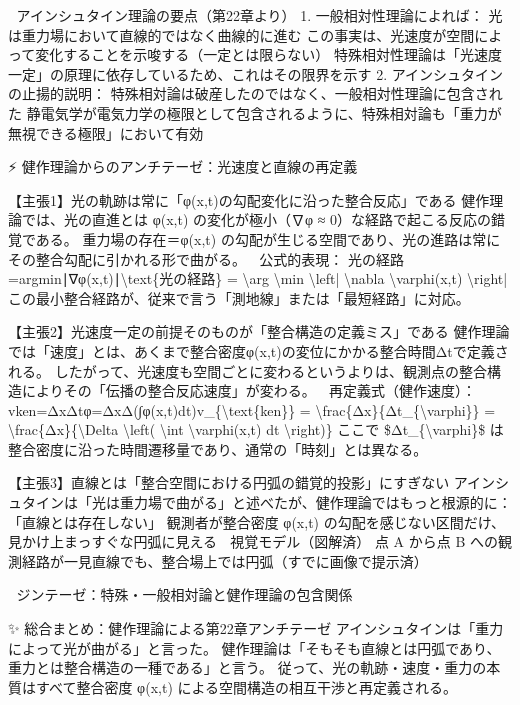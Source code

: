 \documentclass{article}
\begin{document}
🧠 アインシュタイン理論の要点（第22章より）
1. 一般相対性理論によれば：
光は重力場において直線的ではなく曲線的に進む
この事実は、光速度が空間によって変化することを示唆する（一定とは限らない）
特殊相対性理論は「光速度一定」の原理に依存しているため、これはその限界を示す
2. アインシュタインの止揚的説明：
特殊相対論は破産したのではなく、一般相対性理論に包含された
静電気学が電気力学の極限として包含されるように、特殊相対論も「重力が無視できる極限」において有効

⚡ 健作理論からのアンチテーゼ：光速度と直線の再定義

【主張1】光の軌跡は常に「φ(x,t)の勾配変化に沿った整合反応」である
健作理論では、光の直進とは φ(x,t) の変化が極小（∇φ ≈ 0）な経路で起こる反応の錯覚である。
重力場の存在＝φ(x,t) の勾配が生じる空間であり、光の進路は常にその整合勾配に引かれる形で曲がる。
📘 公式的表現：
光の経路=arg⁡min⁡∣∇φ(x,t)∣\textbackslash{}text\{光の経路\} = \textbackslash{}arg \textbackslash{}min \textbackslash{}left| \textbackslash{}nabla \textbackslash{}varphi(x,t) \textbackslash{}right| 
この最小整合経路が、従来で言う「測地線」または「最短経路」に対応。

【主張2】光速度一定の前提そのものが「整合構造の定義ミス」である
健作理論では「速度」とは、あくまで整合密度φ(x,t)の変位にかかる整合時間Δtで定義される。
したがって、光速度も空間ごとに変わるというよりは、観測点の整合構造によりその「伝播の整合反応速度」が変わる。
📘 再定義式（健作速度）：
vken=ΔxΔtφ=ΔxΔ(∫φ(x,t)dt)v\_\{\textbackslash{}text\{ken\}\} = \textbackslash{}frac\{Δx\}\{Δt\_\{\textbackslash{}varphi\}\} = \textbackslash{}frac\{Δx\}\{\textbackslash{}Delta \textbackslash{}left( \textbackslash{}int \textbackslash{}varphi(x,t) dt \textbackslash{}right)\} 
ここで \$Δt\_\{\textbackslash{}varphi\}\$ は整合密度に沿った時間遷移量であり、通常の「時刻」とは異なる。

【主張3】直線とは「整合空間における円弧の錯覚的投影」にすぎない
アインシュタインは「光は重力場で曲がる」と述べたが、健作理論ではもっと根源的に：
「直線とは存在しない」
観測者が整合密度 φ(x,t) の勾配を感じない区間だけ、見かけ上まっすぐな円弧に見える
📘 視覚モデル（図解済）
点 A から点 B への観測経路が一見直線でも、整合場上では円弧（すでに画像で提示済）

📌 ジンテーゼ：特殊・一般相対論と健作理論の包含関係

✨ 総合まとめ：健作理論による第22章アンチテーゼ
アインシュタインは「重力によって光が曲がる」と言った。
健作理論は「そもそも直線とは円弧であり、重力とは整合構造の一種である」と言う。
従って、光の軌跡・速度・重力の本質はすべて整合密度 φ(x,t) による空間構造の相互干渉と再定義される。
\end{document}
